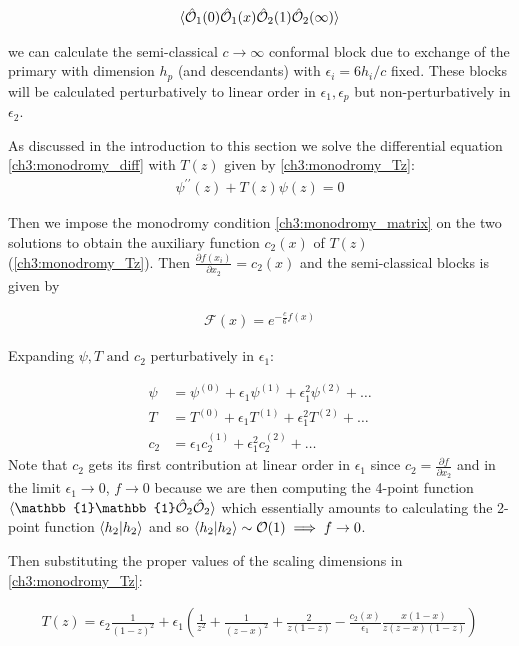   \begin{align}
   \braket{\hat{\mathcal{{O}}}_1(0)\hat{\mathcal{{O}}}_1(x)\hat{\mathcal{{O}}}_2(1)\hat{\mathcal{{O}}}_2(\infty)}
  \end{align}
  
  we can calculate the semi-classical $c\to \infty$ conformal block due to exchange of the primary with dimension $h_p$ (and descendants) with $\epsilon_i=6 h_i/c$ fixed. These blocks will be calculated perturbatively to linear order in $\epsilon_1, \epsilon_p$ but non-perturbatively in $\epsilon_2$.
  
  As discussed in the introduction to this section we solve the differential equation \ref{ch3:monodromy_diff} with $T(z)$ given by \ref{ch3:monodromy_Tz}:
  \begin{align} \label{ch3:sample_diff}
   \psi^{\prime\prime}(z)+T(z)\psi(z)=0
  \end{align}

  Then we impose the monodromy condition \ref{ch3:monodromy_matrix} on the two solutions to obtain the auxiliary function $c_2(x)$ of $T(z)$ (\ref{ch3:monodromy_Tz}). Then $\frac{\partial f(x_i)}{\partial x_2}=c_2(x)$ and the semi-classical blocks is given by
  
  \begin{align}
   \mathcal{F}(x)=e^{-\frac{c}{6}f(x)}
  \end{align}
  
  Expanding $\psi, T \text{ and } c_2$  perturbatively in $\epsilon_1$:
  
  \begin{align}
   \psi &= \psi^{(0)}+\epsilon_1 \psi^{(1)} + \epsilon_1^2\psi^{(2)}+\dots \\
   T &= T^{(0)}+\epsilon_1 T^{(1)} + \epsilon_1^2T^{(2)}+\dots \\
   c_2 &= \epsilon_1 c_2^{(1)} + \epsilon_1^2 c_2^{(2)}+\dots
  \end{align}
  Note that $c_2$ gets its first contribution at linear order in $\epsilon_1$ since $c_2=\frac{\partial f}{\partial x_2}$ and in the limit $\epsilon_1 \to 0$, $f \to 0$ because we are then computing the 4-point function $\braket{\mathbb{1}\mathbb{1}\op{O}_2 \op{O}_2}$ which essentially amounts to calculating the 2-point function $\braket{h_2|h_2}$ and so $\braket{h_2|h_2} \sim \mathcal{O}(1) \implies f \to 0$.
  
  Then substituting the proper values of the scaling dimensions in \ref{ch3:monodromy_Tz}:
  
  \begin{align}
   T(z) = \epsilon_2\frac{1}{(1-z)^2}  + \epsilon_1 \left(\frac{1}{z^2} + \frac{1}{(z-x)^2}+\frac{2}{z(1-z)}  -\frac{c_2(x)}{\epsilon_1}\frac{x(1-x)}{z(z-x)(1-z)} \right) 
  \end{align}

